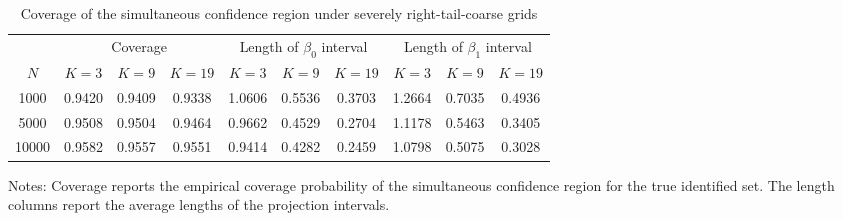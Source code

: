 \begin{table}
\centering
\begin{threeparttable}[!h]
\centering
\caption{\label{tab:partial_identification_region_coverage_right_tail_coarse_severe} Coverage of the simultaneous confidence region under severely right-tail-coarse grids}
\centering
\begin{tabular}[t]{cccccccccc}
\toprule
\multicolumn{1}{c}{ } & \multicolumn{3}{c}{Coverage} & \multicolumn{3}{c}{Length of $\beta_0$ interval} & \multicolumn{3}{c}{Length of $\beta_1$ interval} \\
\cmidrule(l{3pt}r{3pt}){2-4} \cmidrule(l{3pt}r{3pt}){5-7} \cmidrule(l{3pt}r{3pt}){8-10}
$N$ & $K = 3$ & $K = 9$ & $K = 19$ & $K = 3$ & $K = 9$ & $K = 19$ & $K = 3$ & $K = 9$ & $K = 19$\\
\midrule
1000 & 0.9420 & 0.9409 & 0.9338 & 1.0606 & 0.5536 & 0.3703 & 1.2664 & 0.7035 & 0.4936\\
5000 & 0.9508 & 0.9504 & 0.9464 & 0.9662 & 0.4529 & 0.2704 & 1.1178 & 0.5463 & 0.3405\\
10000 & 0.9582 & 0.9557 & 0.9551 & 0.9414 & 0.4282 & 0.2459 & 1.0798 & 0.5075 & 0.3028\\
\bottomrule
\end{tabular}
\begin{tablenotes}
\footnotesize
\item \parbox{\linewidth}{Notes: Coverage reports the empirical coverage probability of the simultaneous confidence region for the true identified set. The length columns report the average lengths of the projection intervals.}
\end{tablenotes}
\end{threeparttable}
\end{table}